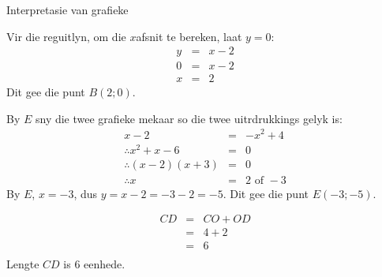 \begin{wex}{Interpretasie van grafieke}
{Vir die reguitlyn, om die $x$afsnit te bereken, laat $y=0$:
\begin{eqnarray*}
  y&=&x-2\\
  0&=& x-2 \\
  x&=&2
\end{eqnarray*}
Dit gee die punt $B(2;0)$.

By $E$ sny die twee grafieke mekaar so die twee uitrdrukkings gelyk is:
\begin{eqnarray*}
  x-2 &=& -x^{2}+4 \\
  \therefore x^2 + x - 6 &=& 0 \\
  \therefore (x-2)(x+3) &=& 0 \\
  \therefore x &=& 2 \mbox{ of } -3
\end{eqnarray*}
By $E$, $x=-3$, dus $y=x-2=-3-2=-5$. Dit gee die punt $E(-3;-5)$.

\begin{equation*}
 \begin{array}{rcl}
  CD&=&CO+OD\\
 &=& 4+2 \\
&=&6\\
 \end{array}
\end{equation*}
Lengte $CD$ is $6$ eenhede.
}
\end{wex}

